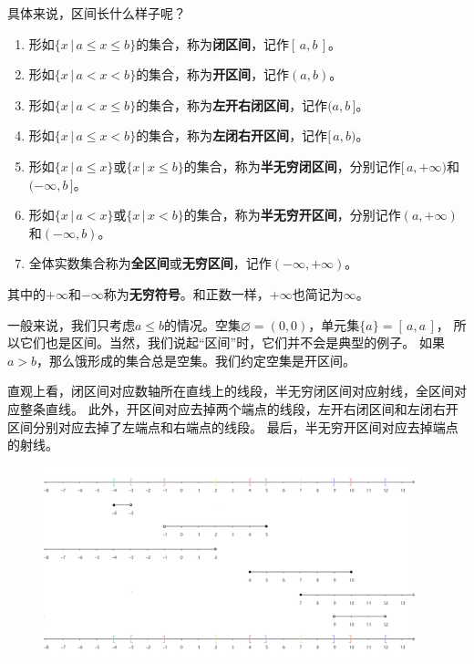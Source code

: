 \documentclass[12pt,UTF8]{ctexbook}
\begin{document}
具体来说，区间长什么样子呢？
\begin{enumerate}
    \item 形如$\{x \, | \, a \leqslant x \leqslant b\}$的集合，称为\textbf{闭区间}，记作$[\, a, b\,]$。
    \item 形如$\{x \, | \, a < x < b\}$的集合，称为\textbf{开区间}，记作$(a, b)$。
    \item 形如$\{x \, | \, a < x \leqslant b\}$的集合，称为\textbf{左开右闭区间}，记作$(a, b\,]$。
    \item 形如$\{x \, | \, a \leqslant x < b\}$的集合，称为\textbf{左闭右开区间}，记作$[\, a, b)$。
    \item 形如$\{x \, | \, a \leqslant x \}$或$\{x \, | \, x \leqslant b \}$的集合，称为\textbf{半无穷闭区间}，分别记作$[\, a, +\infty)$和$(-\infty, b\,]$。
    \item 形如$\{x \, | \, a < x \}$或$\{x \, | \, x < b \}$的集合，称为\textbf{半无穷开区间}，分别记作$(a, +\infty)$和$(-\infty, b)$。
    \item 全体实数集合称为\textbf{全区间}或\textbf{无穷区间}，记作$(-\infty, +\infty)$。
\end{enumerate}
其中的$+\infty$和$-\infty$称为\textbf{无穷符号}。和正数一样，$+\infty$也简记为$\infty$。

一般来说，我们只考虑$a \leqslant b$的情况。空集$\varnothing = (0, 0)$，单元集$\{a\} = [\, a, a\,]$，
所以它们也是区间。当然，我们说起“区间”时，它们并不会是典型的例子。
如果$a > b$，那么饿形成的集合总是空集。我们约定空集是开区间。

直观上看，闭区间对应数轴所在直线上的线段，半无穷闭区间对应射线，全区间对应整条直线。
此外，开区间对应去掉两个端点的线段，左开右闭区间和左闭右开区间分别对应去掉了左端点和右端点的线段。
最后，半无穷开区间对应去掉端点的射线。

\begin{figure}[H] %
    \vspace{8pt}
    \includegraphics[width=0.96\textwidth]{区间1.png}
\end{figure}
\end{document}
